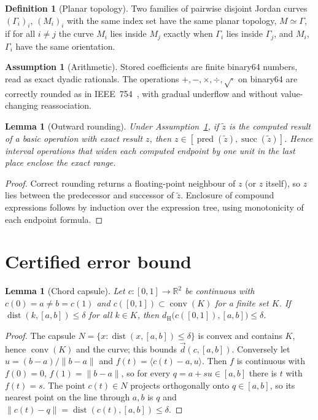 \documentclass[11pt,a4paper]{article}
\newtheorem{lemma}[theorem]{Lemma}
\theoremstyle{definition}
\newtheorem{definition}[theorem]{Definition}
\newtheorem{assumption}{Assumption}
\theoremstyle{remark}
\newcommand{\R}{\mathbb{R}}
\newcommand{\dH}{d_{\mathrm{H}}}
\newcommand{\dist}{\operatorname{dist}}
\newcommand{\conv}{\operatorname{conv}}
\newcommand{\seg}[2]{[#1,#2]}
\newcommand{\ip}[2]{\langle #1,#2\rangle}
\begin{document}
\begin{definition}[Planar topology]\label{def:topology}
Two families of pairwise disjoint Jordan curves $(\Gamma_i)_i$, $(M_i)_i$ with
the same index set have the same planar topology, $M\simeq\Gamma$, if for all
$i\ne j$ the curve $M_i$ lies inside $M_j$ exactly when $\Gamma_i$ lies inside
$\Gamma_j$, and $M_i$, $\Gamma_i$ have the same orientation.
\end{definition}

\begin{assumption}[Arithmetic]\label{ass:ieee}
Stored coefficients are finite binary64 numbers, read as exact dyadic
rationals. The operations $+,-,\times,\div,\sqrt{\cdot}$ on binary64 are
correctly rounded as in IEEE~754~\cite{ieee754}, with gradual underflow and
without value-changing reassociation.
\end{assumption}

\begin{lemma}[Outward rounding]\label{lem:outward}
Under Assumption~\ref{ass:ieee}, if $\tilde z$ is the computed result of a
basic operation with exact result $z$, then
$z\in[\operatorname{pred}(\tilde z),\operatorname{succ}(\tilde z)]$. Hence
interval operations that widen each computed endpoint by one unit in the last
place enclose the exact range.
\end{lemma}
\begin{proof}
Correct rounding returns a floating-point neighbour of $z$ (or $z$ itself), so
$z$ lies between the predecessor and successor of $\tilde z$. Enclosure of
compound expressions follows by induction over the expression tree, using
monotonicity of each endpoint formula.
\end{proof}

\section{Certified error bound}

\begin{lemma}[Chord capsule]\label{lem:capsule}
Let $c:[0,1]\to\R^2$ be continuous with $c(0)=a\ne b=c(1)$ and
$c([0,1])\subset\conv(K)$ for a finite set $K$. If
$\dist(k,\seg ab)\le\delta$ for all $k\in K$, then
$\dH\bigl(c([0,1]),\seg ab\bigr)\le\delta$.
\end{lemma}
\begin{proof}
The capsule $N=\{x:\dist(x,\seg ab)\le\delta\}$ is convex and contains $K$,
hence $\conv(K)$ and the curve; this bounds $\vec d(c,\seg ab)$. Conversely let
$u=(b-a)/\lVert b-a\rVert$ and $f(t)=\ip{c(t)-a}{u}$. Then $f$ is continuous
with $f(0)=0$, $f(1)=\lVert b-a\rVert$, so for every
$q=a+su\in\seg ab$ there is $t$ with $f(t)=s$. The point $c(t)\in N$ projects
orthogonally onto $q\in\seg ab$, so its nearest point on the line through
$a,b$ is $q$ and $\lVert c(t)-q\rVert=\dist(c(t),\seg ab)\le\delta$.
\end{proof}
\end{document}
